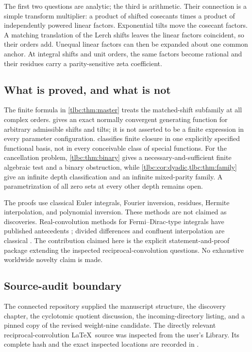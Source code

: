 \documentclass[11pt,letterpaper]{article}
\numberwithin{equation}{section}
\theoremstyle{definition}\newtheorem{definition}[theorem]{Definition}
\theoremstyle{remark}\newtheorem{remark}[theorem]{Remark}
\newcommand{\src}[1]{\texttt{\small\detokenize{#1}}}
\begin{document}
The first two questions are analytic; the third is arithmetic. Their connection is a simple transform multiplier: a product of shifted cosecants times a product of independently powered linear factors. Exponential tilts move the cosecant factors. A matching translation of the Lerch shifts leaves the linear factors coincident, so their orders add. Unequal linear factors can then be expanded about one common anchor. At integral shifts and unit orders, the same factors become rational and their residues carry a parity-sensitive zeta coefficient.

\subsection{What is proved, and what is not}
The finite formula in \cref{tlbc:thm:master} treats the matched-shift subfamily at all complex orders.  gives an exact normally convergent generating function for arbitrary admissible shifts and tilts; it is not asserted to be a finite expression in every parameter configuration.  classifies finite closure in one explicitly specified functional basis, not in every conceivable class of special functions. For the cancellation problem, \cref{tlbc:thm:binary} gives a necessary-and-sufficient finite algebraic test and a binary obstruction, while \cref{tlbc:cor:dyadic,tlbc:thm:family} give an infinite depth classification and an infinite mixed-parity family. A parametrization of all zero sets at every other depth remains open.

The proofs use classical Euler integrals, Fourier inversion, residues, Hermite interpolation, and polynomial inversion. These methods are not claimed as discoveries. Real-convolution methods for Fermi--Dirac-type integrals have published antecedents \cite{Selvaggi}; divided differences and confluent interpolation are classical \cite{deBoor}. The contribution claimed here is the explicit statement-and-proof package extending the inspected reciprocal-convolution questions. No exhaustive worldwide novelty claim is made.

\subsection{Source-audit boundary}
The connected repository supplied the manuscript structure, the discovery chapter, the cyclotomic quotient discussion, the incoming-directory listing, and a pinned copy of the revised weight-nine candidate. The directly relevant reciprocal-convolution \LaTeX\ source was inspected from the user's Library. Its complete hash and the exact inspected locations are recorded in \src{SOURCE_AUDIT.md}.
\end{document}
